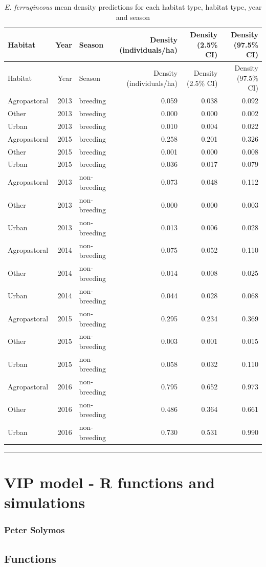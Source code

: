 \documentclass[]{article}
\begin{document}
\begin{longtable}[]{@{}lrlrrr@{}}
\caption{\textit{E. ferrugineous} mean density predictions for each
habitat type, habitat type, year and season}\tabularnewline
\toprule
Habitat & Year & Season & Density (individuals/ha) & Density (2.5\% CI)
& Density (97.5\% CI)\tabularnewline
\midrule
\endfirsthead
\toprule
Habitat & Year & Season & Density (individuals/ha) & Density (2.5\% CI)
& Density (97.5\% CI)\tabularnewline
\midrule
\endhead
Agropastoral & 2013 & breeding & 0.059 & 0.038 & 0.092\tabularnewline
Other & 2013 & breeding & 0.000 & 0.000 & 0.002\tabularnewline
Urban & 2013 & breeding & 0.010 & 0.004 & 0.022\tabularnewline
Agropastoral & 2015 & breeding & 0.258 & 0.201 & 0.326\tabularnewline
Other & 2015 & breeding & 0.001 & 0.000 & 0.008\tabularnewline
Urban & 2015 & breeding & 0.036 & 0.017 & 0.079\tabularnewline
Agropastoral & 2013 & non-breeding & 0.073 & 0.048 &
0.112\tabularnewline
Other & 2013 & non-breeding & 0.000 & 0.000 & 0.003\tabularnewline
Urban & 2013 & non-breeding & 0.013 & 0.006 & 0.028\tabularnewline
Agropastoral & 2014 & non-breeding & 0.075 & 0.052 &
0.110\tabularnewline
Other & 2014 & non-breeding & 0.014 & 0.008 & 0.025\tabularnewline
Urban & 2014 & non-breeding & 0.044 & 0.028 & 0.068\tabularnewline
Agropastoral & 2015 & non-breeding & 0.295 & 0.234 &
0.369\tabularnewline
Other & 2015 & non-breeding & 0.003 & 0.001 & 0.015\tabularnewline
Urban & 2015 & non-breeding & 0.058 & 0.032 & 0.110\tabularnewline
Agropastoral & 2016 & non-breeding & 0.795 & 0.652 &
0.973\tabularnewline
Other & 2016 & non-breeding & 0.486 & 0.364 & 0.661\tabularnewline
Urban & 2016 & non-breeding & 0.730 & 0.531 & 0.990\tabularnewline
\bottomrule
\end{longtable}

\begin{center}\rule{0.5\linewidth}{\linethickness}\end{center}

\section{VIP model - R functions and
simulations}\label{vip-model---r-functions-and-simulations}

\subsubsection{Peter Solymos}\label{peter-solymos}

\subsection{Functions}\label{functions}
\end{document}
